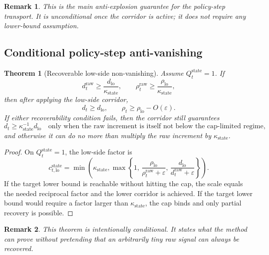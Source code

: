 \documentclass[11pt]{article}
\newtheorem{theorem}{Theorem}
\newtheorem{remark}{Remark}
\newcommand{\1}{\mathbf{1}}
\begin{document}
\begin{remark}
This is the main anti-explosion guarantee for the policy-step transport. It is unconditional once the corridor is active; it does not require any lower-bound assumption.
\end{remark}

\subsection{Conditional policy-step anti-vanishing}
\begin{theorem}[Recoverable low-side non-vanishing]
Assume $Q_t^{\mathrm{state}}=1$. If
\begin{equation}
  d_t^{\mathrm{raw}} \ge \frac{d_{\mathrm{lo}}}{\kappa_{\mathrm{state}}},
  \qquad
  \rho_t^{\mathrm{raw}} \ge \frac{\rho_{\mathrm{lo}}}{\kappa_{\mathrm{state}}},
\end{equation}
then after applying the low-side corridor,
\begin{equation}
  d_t \ge d_{\mathrm{lo}},
  \qquad
  \rho_t \ge \rho_{\mathrm{lo}} - O(\varepsilon).
\end{equation}
If either recoverability condition fails, then the corridor still guarantees
\begin{equation}
  d_t \ge \kappa_{\mathrm{state}}^{-1} d_{\mathrm{lo}}
  \quad\text{only when the raw increment is itself not below the cap-limited regime,}
\end{equation}
and otherwise it can do no more than multiply the raw increment by $\kappa_{\mathrm{state}}$.
\end{theorem}

\begin{proof}
On $Q_t^{\mathrm{state}}=1$, the low-side factor is
\[
  c_{t,\mathrm{lo}}^{\mathrm{state}}
  =
  \min\!\left(\kappa_{\mathrm{state}},
    \max\left\{
      1,\,
      \frac{\rho_{\mathrm{lo}}}{\rho_t^{\mathrm{raw}} + \varepsilon},\,
      \frac{d_{\mathrm{lo}}}{d_t^{\mathrm{raw}} + \varepsilon}
    \right\}
  \right).
\]
If the target lower bound is reachable without hitting the cap, the scale equals the needed reciprocal factor and the lower corridor is achieved. If the target lower bound would require a factor larger than $\kappa_{\mathrm{state}}$, the cap binds and only partial recovery is possible.
\end{proof}

\begin{remark}
This theorem is intentionally conditional. It states what the method can prove without pretending that an arbitrarily tiny raw signal can always be recovered.
\end{remark}
\end{document}
